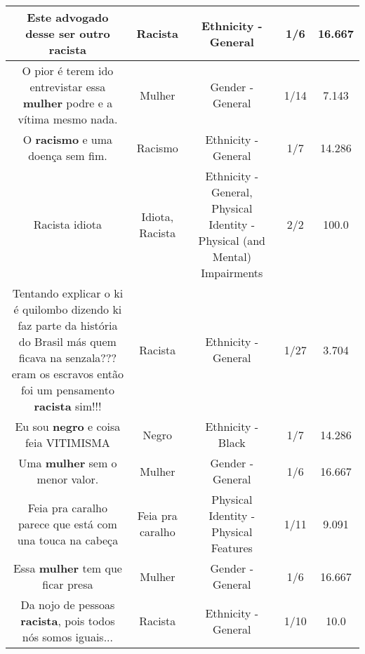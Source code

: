 \documentclass[11pt]{article}
\newlength\mylength
\begin{document}
\begin{center}
\begin{longtable}{|C{.65\mylength}|C{.30\mylength}|C{.12\mylength}|C{.12\mylength}|C{.12\mylength}|}
  \small Este advogado desse ser outro racista\normalsize   & Racista & Ethnicity - General & 1/6 & 16.667 \\  \hline
  \small O pior é terem ido entrevistar essa \textbf{mulher} podre e a vítima mesmo nada.\normalsize   & Mulher & Gender - General & 1/14 & 7.143 \\  \hline
  \small O \textbf{racismo} e uma doença sem fim.\normalsize   & Racismo & Ethnicity - General & 1/7 & 14.286 \\  \hline
  \small Racista idiota\normalsize   & Idiota, Racista & Ethnicity - General, Physical Identity - Physical (and Mental) Impairments & 2/2 & 100.0 \\  \hline
  \small Tentando explicar o ki é quilombo dizendo ki faz parte da história do Brasil más quem ficava na senzala???eram os escravos então foi um pensamento \textbf{racista} sim!!!\normalsize   & Racista & Ethnicity - General & 1/27 & 3.704 \\  \hline
  \small Eu sou \textbf{negro} e coisa feia VITIMISMA\normalsize   & Negro & Ethnicity - Black & 1/7 & 14.286 \\  \hline
  \small Uma \textbf{mulher} sem o menor valor.\normalsize   & Mulher & Gender - General & 1/6 & 16.667 \\  \hline
  \small Feia pra caralho parece que está com una touca na cabeça\normalsize   & Feia pra caralho & Physical Identity - Physical Features & 1/11 & 9.091 \\  \hline
  \small Essa \textbf{mulher} tem que ficar presa\normalsize   & Mulher & Gender - General & 1/6 & 16.667 \\  \hline
  \small Da nojo de pessoas \textbf{racista}, pois todos nós somos iguais...\normalsize   & Racista & Ethnicity - General & 1/10 & 10.0 \\  \hline

\end{longtable}
\end{center}
\end{document}
